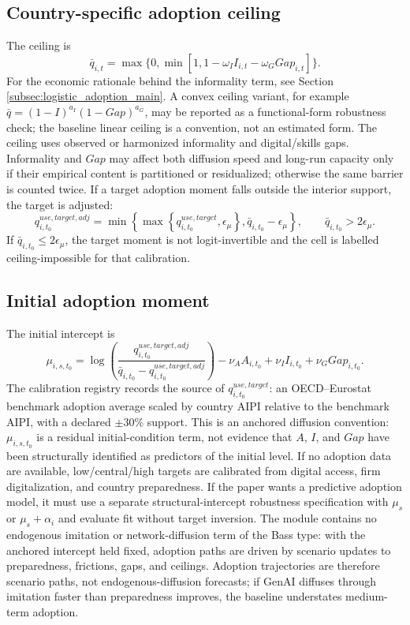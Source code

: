 \documentclass[11pt,a4paper]{article}
\begin{document}
\subsection{Country-specific adoption ceiling}

The ceiling is
\begin{equation}
    \bar q_{i,t}=\max\{0,\min[1,1-\omega_I I_{i,t}-\omega_G Gap_{i,t}]\}.
\end{equation}
For the economic rationale behind the informality term, see Section \ref{subsec:logistic_adoption_main}. A convex ceiling variant, for example $\bar q=(1-I)^{a_I}(1-Gap)^{a_G}$, may be reported as a functional-form robustness check; the baseline linear ceiling is a convention, not an estimated form.
The ceiling uses observed or harmonized informality and digital/skills gaps. Informality and $Gap$ may affect both diffusion speed and long-run capacity only if their empirical content is partitioned or residualized; otherwise the same barrier is counted twice. If a target adoption moment falls outside the interior support, the target is adjusted:
\begin{equation}
    q^{use,target,adj}_{i,t_0}
    =\min\left\{\max\left\{q^{use,target}_{i,t_0},\epsilon_\mu\right\},\bar q_{i,t_0}-\epsilon_\mu\right\},
    \qquad \bar q_{i,t_0}>2\epsilon_\mu.
\end{equation}
If $\bar q_{i,t_0}\leq2\epsilon_\mu$, the target moment is not logit-invertible and the cell is labelled ceiling-impossible for that calibration.

\subsection{Initial adoption moment}

The initial intercept is
\begin{equation}
    \mu_{i,s,t_0}=\log\left(\frac{q^{use,target,adj}_{i,t_0}}{\bar q_{i,t_0}-q^{use,target,adj}_{i,t_0}}\right)
    -\nu_A A_{i,t_0}+\nu_I I_{i,t_0}+\nu_G Gap_{i,t_0}.
\end{equation}
The calibration registry records the source of $q^{use,target}_{i,t_0}$: an OECD--Eurostat benchmark adoption average scaled by country AIPI relative to the benchmark AIPI, with a declared $\pm30\%$ support. This is an anchored diffusion convention: $\mu_{i,s,t_0}$ is a residual initial-condition term, not evidence that $A$, $I$, and $Gap$ have been structurally identified as predictors of the initial level. If no adoption data are available, low/central/high targets are calibrated from digital access, firm digitalization, and country preparedness. If the paper wants a predictive adoption model, it must use a separate structural-intercept robustness specification with $\mu_s$ or $\mu_s+\alpha_i$ and evaluate fit without target inversion. The module contains no endogenous imitation or network-diffusion term of the Bass type: with the anchored intercept held fixed, adoption paths are driven by scenario updates to preparedness, frictions, gaps, and ceilings. Adoption trajectories are therefore scenario paths, not endogenous-diffusion forecasts; if GenAI diffuses through imitation faster than preparedness improves, the baseline understates medium-term adoption.
\end{document}
